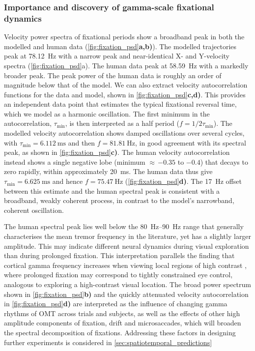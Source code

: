 \subsubsection*{Importance and discovery of gamma-scale fixational dynamics}
Velocity power spectra of fixational periods show a broadband peak in both the modelled and human data (\cref{fig:fixation_psd}\textbf{a,b)}). The modelled trajectories peak at \qty{78.12}{\hertz} with a narrow peak and near-identical X- and Y-velocity spectra (\cref{fig:fixation_psd}a). The human data peak at \qty{58.59}{\hertz} with a markedly broader peak. The peak power of the human data is roughly an order of magnitude below that of the model. We can also extract velocity autocorrelation functions for the data and model, shown in \cref{fig:fixation_psd}\textbf{c,d)}. This provides an independent data point that estimates the typical fixational reversal time, which we model as a harmonic oscillation. The first minimum in the autocorrelation, $\tau_{\min}$, is then interpreted as a half period ($f = 1/2\tau_{\min}$). The modelled velocity autocorrelation shows damped oscillations over several cycles, with $\tau_{\min}=\qty{6.112}{\milli\second}$ and then $f=\qty{81.81}{\hertz}$, in good agreement with its spectral peak, as shown in \cref{fig:fixation_psd}\textbf{c)}. The human velocity autocorrelation instead shows a single negative lobe (minimum ${\approx}\,{-0.35}$ to $-0.4$) that decays to zero rapidly, within approximately \qty{20}{\milli\second}. The human data thus give $\tau_{\min}=\qty{6.625}{\milli\second}$ and hence $f=\qty{75.47}{\hertz}$ (\cref{fig:fixation_psd}\textbf{d)}. The \qty{17}{\hertz} offset between this estimate and the human spectral peak is consistent with a broadband, weakly coherent process, in contrast to the model's narrowband, coherent oscillation.

The human spectral peak lies well below the \qtyrange{80}{90}{\hertz} range that generally characterises the mean tremor frequency in the literature, yet has a slightly larger amplitude. This may indicate different neural dynamics during visual exploration than during prolonged fixation. This interpretation parallels the finding that cortical gamma frequency increases when viewing local regions of high contrast \cite{han_gamma_2022, Adjamian2008-rz, RAY2010885}, where prolonged fixation may correspond to tightly constrained eye control, analogous to exploring a high-contrast visual location. The broad power spectrum shown in \cref{fig:fixation_psd}\textbf{b)} and the quickly attenuated velocity autocorrelation in \cref{fig:fixation_psd}\textbf{d)} are interpreted as the influence of changing gamma rhythms of OMT across trials and subjects, as well as the effects of other high amplitude components of fixation, drift and microsaccades, which will broaden the spectral decomposition of fixations. Addressing these factors in designing further experiments is considered in \cref{sec:spatiotemporal_predictions}

